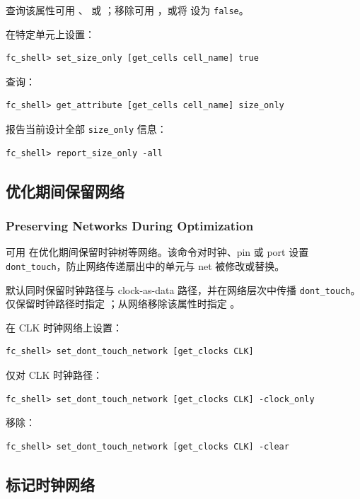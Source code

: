 查询该属性可用 、 或 ；移除可用 ，或将  设为 \texttt{false}。

在特定单元上设置：
\begin{lstlisting}
fc_shell> set_size_only [get_cells cell_name] true
\end{lstlisting}

查询：
\begin{lstlisting}
fc_shell> get_attribute [get_cells cell_name] size_only
\end{lstlisting}

报告当前设计全部 \texttt{size\_only} 信息：
\begin{lstlisting}
fc_shell> report_size_only -all
\end{lstlisting}

\subsection{优化期间保留网络}
\subsubsection*{Preserving Networks During Optimization}

可用  在优化期间保留时钟树等网络。该命令对时钟、pin 或 port 设置 \texttt{dont\_touch}，防止网络传递扇出中的单元与 net 被修改或替换。

默认同时保留时钟路径与 clock-as-data 路径，并在网络层次中传播 \texttt{dont\_touch}。仅保留时钟路径时指定 ；从网络移除该属性时指定 。

在 CLK 时钟网络上设置：
\begin{lstlisting}
fc_shell> set_dont_touch_network [get_clocks CLK]
\end{lstlisting}

仅对 CLK 时钟路径：
\begin{lstlisting}
fc_shell> set_dont_touch_network [get_clocks CLK] -clock_only
\end{lstlisting}

移除：
\begin{lstlisting}
fc_shell> set_dont_touch_network [get_clocks CLK] -clear
\end{lstlisting}

\subsection{标记时钟网络}
